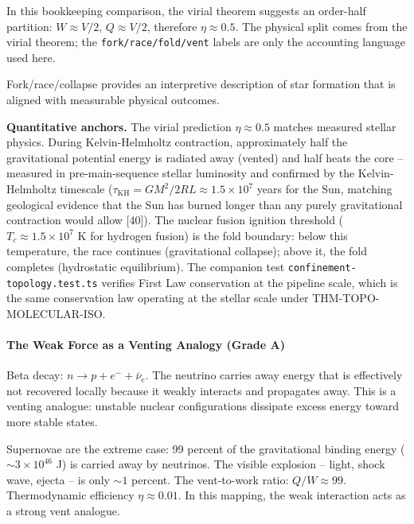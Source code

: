 \documentclass[
  11pt,
]{article}
\begin{document}
In this bookkeeping comparison, the virial theorem suggests an
order-half partition: \(W \approx V/2\), \(Q \approx V/2\), therefore
\(\eta \approx 0.5\). The physical split comes from the virial theorem;
the \texttt{fork/race/fold/vent} labels are only the accounting language
used here.

Fork/race/collapse provides an interpretive description of star
formation that is aligned with measurable physical outcomes.

\textbf{Quantitative anchors.} The virial prediction
\(\eta \approx 0.5\) matches measured stellar physics. During
Kelvin-Helmholtz contraction, approximately half the gravitational
potential energy is radiated away (vented) and half heats the core --
measured in pre-main-sequence stellar luminosity and confirmed by the
Kelvin-Helmholtz timescale
(\(\tau_{\text{KH}} = GM^2 / 2RL \approx 1.5 \times 10^7\) years for the
Sun, matching geological evidence that the Sun has burned longer than
any purely gravitational contraction would allow {[}40{]}). The nuclear
fusion ignition threshold (\(T_c \approx 1.5 \times 10^7\) K for
hydrogen fusion) is the fold boundary: below this temperature, the race
continues (gravitational collapse); above it, the fold completes
(hydrostatic equilibrium). The companion test
\texttt{confinement-topology.test.ts} verifies First Law conservation at
the pipeline scale, which is the same conservation law operating at the
stellar scale under THM-TOPO-MOLECULAR-ISO.

\paragraph{The Weak Force as a Venting Analogy (Grade
A)}\label{the-weak-force-as-a-venting-analogy-grade-a}

Beta decay: \(n \to p + e^- + \bar{\nu}_e\). The neutrino carries away
energy that is effectively not recovered locally because it weakly
interacts and propagates away. This is a venting analogue: unstable
nuclear configurations dissipate excess energy toward more stable
states.

Supernovae are the extreme case: 99 percent of the gravitational binding
energy (\(\sim 3 \times 10^{46}\) J) is carried away by neutrinos. The
visible explosion -- light, shock wave, ejecta -- is only \(\sim 1\)
percent. The vent-to-work ratio: \(Q/W \approx 99\). Thermodynamic
efficiency \(\eta \approx 0.01\). In this mapping, the weak interaction
acts as a strong vent analogue.
\end{document}
